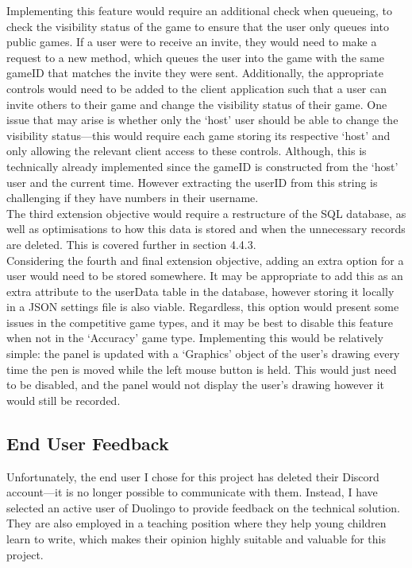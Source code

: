 \documentclass{article}
\begin{document}
Implementing this feature would require an additional check when queueing, to check the visibility status of the game to ensure that the user only queues into public games. If a user were to receive an invite, they would need to make a request to a new method, which queues the user into the game with the same gameID that matches the invite they were sent. Additionally, the appropriate controls would need to be added to the client application such that a user can invite others to their game and change the visibility status of their game. One issue that may arise is whether only the `host' user should be able to change the visibility status---this would require each game storing its respective `host' and only allowing the relevant client access to these controls. Although, this is technically already implemented since the gameID is constructed from the `host' user and the current time. However extracting the userID from this string is challenging if they have numbers in their username. \\

The third extension objective would require a restructure of the SQL database, as well as optimisations to how this data is stored and when the unnecessary records are deleted. This is covered further in section 4.4.3. \\

Considering the fourth and final extension objective, adding an extra option for a user would need to be stored somewhere. It may be appropriate to add this as an extra attribute to the userData table in the database, however storing it locally in a JSON settings file is also viable. Regardless, this option would present some issues in the competitive game types, and it may be best to disable this feature when not in the `Accuracy' game type. Implementing this would be relatively simple: the panel is updated with a `Graphics' object of the user's drawing every time the pen is moved while the left mouse button is held. This would just need to be disabled, and the panel would not display the user's drawing however it would still be recorded. 

\subsection{End User Feedback}

Unfortunately, the end user I chose for this project has deleted their Discord account---it is no longer possible to communicate with them. Instead, I have selected an active user of Duolingo to provide feedback on the technical solution. They are also employed in a teaching position where they help young children learn to write, which makes their opinion highly suitable and valuable for this project.
\end{document}
